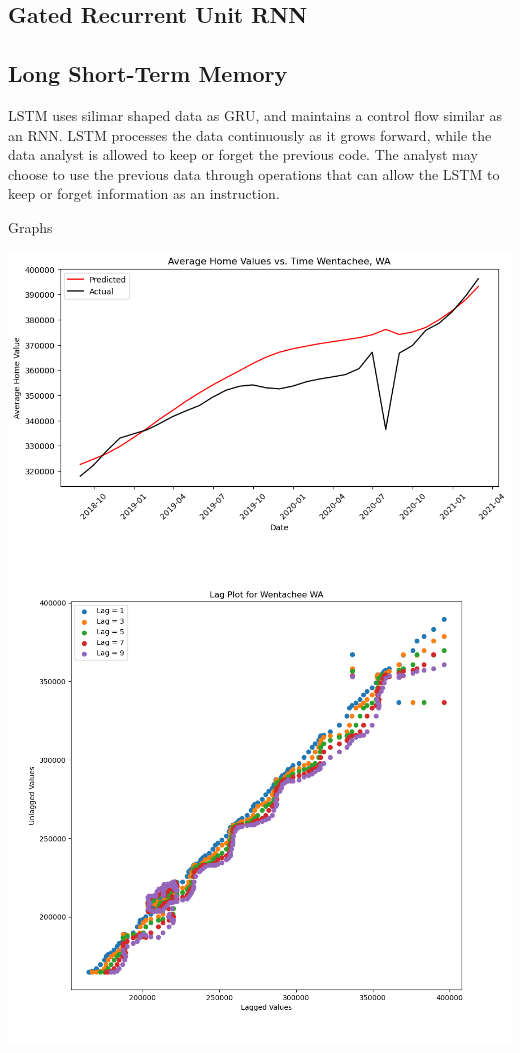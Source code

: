 \documentclass{article}
\begin{document}
	\subsection{Gated Recurrent Unit RNN}
	\subsection{Long Short-Term Memory}
	
	LSTM uses silimar shaped data as GRU, and maintains a control flow similar as an RNN. LSTM processes the data continuously as it grows 
	forward, while the data analyst is allowed to keep or forget the previous code. The analyst may choose to use the previous data through
	operations that can allow the LSTM to keep or forget information as an instruction.

	Graphs
	
	\includegraphics[scale = 0.2]{../plots/wentachee_1d_lstm.png}
	\includegraphics[scale = 0.2]{../plots/wentachee_lag.png}
\end{document}
